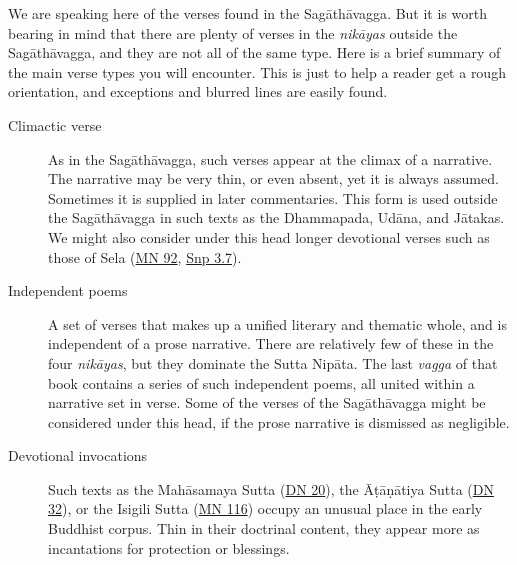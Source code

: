 \documentclass[12pt,openany]{book}%
\begin{document}
We are speaking here of the verses found in the \textsanskrit{Sagāthāvagga}. But it is worth bearing in mind that there are plenty of verses in the \textit{\textsanskrit{nikāyas}} outside the \textsanskrit{Sagāthāvagga}, and they are not all of the same type. Here is a brief summary of the main verse types you will encounter. This is just to help a reader get a rough orientation, and exceptions and blurred lines are easily found.

\begin{description}%
\item[Climactic verse] As in the \textsanskrit{Sagāthāvagga}, such verses appear at the climax of a narrative. The narrative may be very thin, or even absent, yet it is always assumed. Sometimes it is supplied in later commentaries. This form is used outside the \textsanskrit{Sagāthāvagga} in such texts as the Dhammapada, \textsanskrit{Udāna}, and \textsanskrit{Jātakas}. We might also consider under this head longer devotional verses such as those of Sela (\href{https://suttacentral.net/mn92}{MN 92}, \href{https://suttacentral.net/snp3.7}{Snp 3.7}).%
\item[Independent poems] A set of verses that makes up a unified literary and thematic whole, and is independent of a prose narrative. There are relatively few of these in the four \textit{\textsanskrit{nikāyas}}, but they dominate the Sutta \textsanskrit{Nipāta}. The last \textit{vagga} of that book contains a series of such independent poems, all united within a narrative set in verse. Some of the verses of the \textsanskrit{Sagāthāvagga} might be considered under this head, if the prose narrative is dismissed as negligible.%
\item[Devotional invocations] Such texts as the \textsanskrit{Mahāsamaya} Sutta (\href{https://suttacentral.net/dn20}{DN 20}), the \textsanskrit{Āṭāṇātiya} Sutta (\href{https://suttacentral.net/dn32}{DN 32}), or the Isigili Sutta (\href{https://suttacentral.net/mn116}{MN 116}) occupy an unusual place in the early Buddhist corpus. Thin in their doctrinal content, they appear more as incantations for protection or blessings.%

\end{description}
\end{document}
